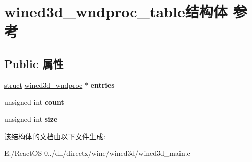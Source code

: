 \hypertarget{structwined3d__wndproc__table}{}\section{wined3d\+\_\+wndproc\+\_\+table结构体 参考}
\label{structwined3d__wndproc__table}
\subsection*{Public 属性}
\begin{DoxyCompactItemize}
\item 
\mbox{\label{structwined3d__wndproc__table_a41791ecbf59b48d44954aba084c79ed4}} 
\hyperlink{interfacestruct}{struct} \hyperlink{structwined3d__wndproc}{wined3d\+\_\+wndproc} $\ast$ {\bfseries entries}
\item 
\mbox{\label{structwined3d__wndproc__table_acb0a1d9e563adacf6d63499cdcff304a}} 
unsigned int {\bfseries count}
\item 
\mbox{\label{structwined3d__wndproc__table_ae6338bdeaa67f162b0e6f59e1fc752f1}} 
unsigned int {\bfseries size}
\end{DoxyCompactItemize}


该结构体的文档由以下文件生成\+:\begin{DoxyCompactItemize}
\item 
E\+:/\+React\+O\+S-\/0../dll/directx/wine/wined3d/wined3d\+\_\+main.\+c\end{DoxyCompactItemize}
